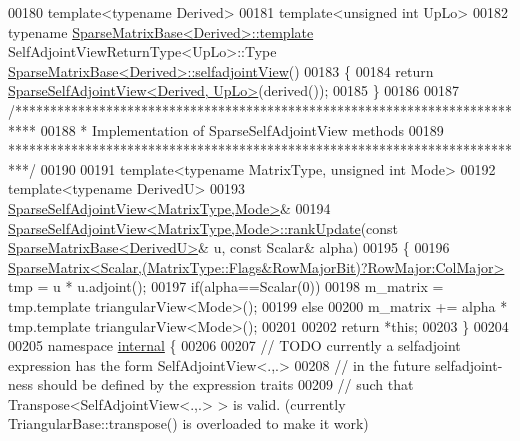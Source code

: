 \begin{DoxyCode}
00180 \textcolor{keyword}{template}<\textcolor{keyword}{typename} Derived>
00181 \textcolor{keyword}{template}<\textcolor{keywordtype}{unsigned} \textcolor{keywordtype}{int} UpLo>
00182 \textcolor{keyword}{typename} \hyperlink{group___sparse_core___module_class_eigen_1_1_sparse_matrix_base}{SparseMatrixBase<Derived>::template} 
      SelfAdjointViewReturnType<UpLo>::Type \hyperlink{group___sparse_core___module_class_eigen_1_1_sparse_matrix_base}{SparseMatrixBase<Derived>::selfadjointView}()
00183 \{
00184   \textcolor{keywordflow}{return} \hyperlink{group___sparse_core___module_class_eigen_1_1_sparse_self_adjoint_view}{SparseSelfAdjointView<Derived, UpLo>}(derived());
00185 \}
00186 
00187 \textcolor{comment}{/***************************************************************************}
00188 \textcolor{comment}{* Implementation of SparseSelfAdjointView methods}
00189 \textcolor{comment}{***************************************************************************/}
00190 
00191 \textcolor{keyword}{template}<\textcolor{keyword}{typename} MatrixType, \textcolor{keywordtype}{unsigned} \textcolor{keywordtype}{int} Mode>
00192 \textcolor{keyword}{template}<\textcolor{keyword}{typename} DerivedU>
00193 \hyperlink{group___sparse_core___module_class_eigen_1_1_sparse_self_adjoint_view}{SparseSelfAdjointView<MatrixType,Mode>}&
00194 \hyperlink{group___sparse_core___module_abe66734215f8d8220be0985d67901021}{SparseSelfAdjointView<MatrixType,Mode>::rankUpdate}(\textcolor{keyword}{const} 
      \hyperlink{group___sparse_core___module_class_eigen_1_1_sparse_matrix_base}{SparseMatrixBase<DerivedU>}& u, \textcolor{keyword}{const} Scalar& alpha)
00195 \{
00196   \hyperlink{group___sparse_core___module_class_eigen_1_1_sparse_matrix}{SparseMatrix<Scalar,(MatrixType::Flags&RowMajorBit)?RowMajor:ColMajor>}
       tmp = u * u.adjoint();
00197   \textcolor{keywordflow}{if}(alpha==Scalar(0))
00198     m\_matrix = tmp.template triangularView<Mode>();
00199   \textcolor{keywordflow}{else}
00200     m\_matrix += alpha * tmp.template triangularView<Mode>();
00201 
00202   \textcolor{keywordflow}{return} *\textcolor{keyword}{this};
00203 \}
00204 
00205 \textcolor{keyword}{namespace }\hyperlink{namespaceinternal}{internal} \{
00206   
00207 \textcolor{comment}{// TODO currently a selfadjoint expression has the form SelfAdjointView<.,.>}
00208 \textcolor{comment}{//      in the future selfadjoint-ness should be defined by the expression traits}
00209 \textcolor{comment}{//      such that Transpose<SelfAdjointView<.,.> > is valid. (currently TriangularBase::transpose() is
       overloaded to make it work)}

\end{DoxyCode}
